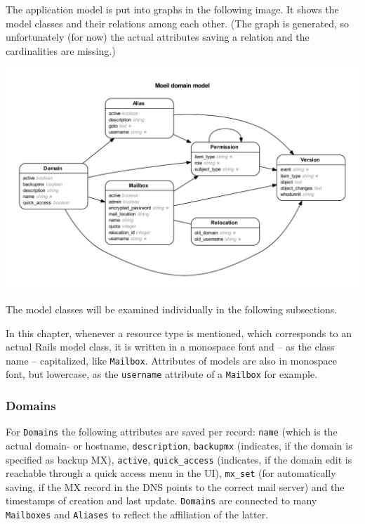 \documentclass[12pt,a4paper]{scrartcl}
\begin{document}
			The application model is put into graphs in the following image. It
			shows the model classes and their relations among each other. (The
			graph is generated, so unfortunately (for now) the actual
			attributes saving a relation and the cardinalities are missing.)

			\includegraphics[width=\textwidth]{images/erd.pdf}

			The model classes will be examined individually in the following
			subsections.
			\s

			In this chapter, whenever a resource type is mentioned, which
			corresponds to an actual \ac{Rails} model class, it is written in a
			monospace font and -- as the class name -- capitalized, like
			\texttt{Mailbox}. Attributes of models are also in monospace font,
			but lowercase, as the \texttt{username} attribute of a
			\texttt{Mailbox} for example.

			\subsubsection{Domains}
				For \texttt{Domains} the following attributes are saved per
				record: \texttt{name} (which is the actual domain- or hostname,
				\texttt{description}, \texttt{backupmx} (indicates, if the
				domain is specified as backup MX), \texttt{active},
				\texttt{quick\_access} (indicates, if the domain edit is
				reachable through a quick access menu in the \ac{UI}),
				\texttt{mx\_set} (for automatically saving, if the MX record in
				the DNS points to the correct mail server) and the timestamps
				of creation and last update. \texttt{Domains} are connected to
				many \texttt{Mailboxes} and \texttt{Aliases} to reflect the
				affiliation of the latter.
\end{document}
